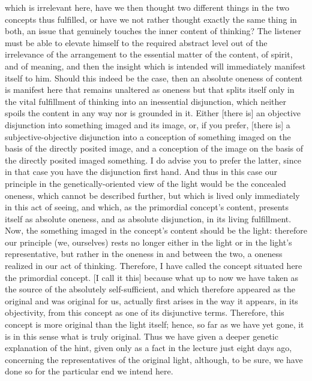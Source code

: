 which is irrelevant here,
have we then thought two different things
in the two concepts thus fulfilled,
or have we not rather thought exactly the same thing in both,
an issue that genuinely touches the inner content of thinking?
The listener must be able to elevate himself
to the required abstract level
out of the irrelevance of the arrangement
to the essential matter of the content,
of spirit, and of meaning, and
then the insight which is intended will
immediately manifest itself to him.
Should this indeed be the case,
then an absolute oneness of content is
manifest here that remains unaltered as oneness
but that splits itself only in
the vital fulfillment of
thinking into an inessential disjunction,
which neither spoils the content
in any way nor is grounded in it.
Either [there is] an objective disjunction
into something imaged and its image,
or, if you prefer, [there is]
a subjective-objective disjunction
into a conception of something imaged
on the basis of the directly posited image,
and a conception of the image on the basis of
the directly posited imaged something.
I do advise you to prefer the latter,
since in that case you have
the disjunction first hand.
And thus in this case our principle
in the genetically-oriented view of the light
would be the concealed oneness,
which cannot be described further,
but which is lived only immediately
in this act of seeing, and which,
as the primordial concept’s content,
presents itself as absolute oneness,
and as absolute disjunction,
in its living fulfillment.
Now, the something imaged
in the concept’s content
should be the light:
therefore our principle (we, ourselves)
rests no longer either in the light
or in the light’s representative,
but rather in the oneness in and between the two,
a oneness realized in our act of thinking.
Therefore, I have called the concept situated here
the primordial concept.
[I call it this] because what up to now
we have taken as the source
of the absolutely self-sufficient,
and which therefore appeared as the original
and was original for us,
actually first arises in the way it appears,
in its objectivity,
from this concept
as one of its disjunctive terms.
Therefore, this concept is more original
than the light itself;
hence, so far as we have yet gone,
it is in this sense what is truly original.
Thus we have given a deeper genetic explanation of the hint,
given only as a fact in the lecture just eight days ago,
concerning the representatives of the original light,
although, to be sure, we have done so
for the particular end we intend here.

